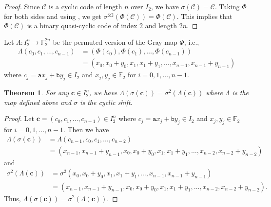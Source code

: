 \documentclass[12pt]{article}
\newtheorem{theorem}{Theorem}[section]
\theoremstyle{definition}
\theoremstyle{plain}
\newcommand{\Blue}[1]{{ \color{blue} #1}}
\begin{document}
\begin{proof}
Since $\mathcal{C}$ is a cyclic code of length $n$ over $I_2$, we have $\sigma (\mathcal{C}) = \mathcal{C}$. Taking $\Phi$ for both sides and using  , we get $\sigma^{\otimes 2} ( \Phi (\mathcal{C}) ) = \Phi (\mathcal{C})$. This implies that $\Phi (\mathcal{C})$ is a binary quasi-cyclic code of index $2$ and length $2n$.
\end{proof}



Let $\Lambda : I_2^n \to  \mathbb{F} _2^{2n}$ be the permuted version of the Gray map $\Phi$, i.e.,
\begin{align*}
\Lambda ( c_0 , c_1 , \dotsc , c_{n-1} ) &= ( \Phi (c_0) , \Phi (c_1 ) , \dotsc , \Phi (c_{n-1} )  )  \\
&= (  x_0 , x_0 + y_0 , x_1 , x_1 + y_1 , \dotsc ,  x_{n-1} ,  x_{n-1} + y_{n-1}   )
\end{align*}
where $c_j =  \mathtt{a}  x_j  +  \mathtt{b}  y_j \in I_2$ and $x_j, y_j \in   \mathbb{F} _2$ for $i = 0 , 1 , \dotsc , n-1$.


\begin{theorem}  \label{thm: Gray map variant and cyclic shift}
For any $ \mathbf{c}  \in  I_2^n$, we have $\Lambda ( \sigma ( \mathbf{c} ) ) = \sigma^2 ( \Lambda ( \mathbf{c} ) )$ where $\Lambda$ is the map defined above and $\sigma$ is the cyclic shift.
\end{theorem}


\begin{proof}
Let $ \mathbf{c} = (c_0 , c_1 , \dotsc , c_{n-1}) \in I_2^n$ where $c_j =  \mathtt{a}  x_j  +  \mathtt{b}  y_j \in I_2$ and $x_j, y_j \in   \mathbb{F} _2$ for $i = 0 , 1 , \dotsc , n-1$. Then we have
\begin{align*}
\Lambda ( \sigma ( \mathbf{c} )) &= \Lambda ( c_{n-1} , c_0 , c_1 , \dotsc , c_{n-2}  )  \\
&= ( x_{n-1} , x_{n-1} + y_{n-1} , x_0, x_0 + y_0,  x_1 , x_1 + y_1 , \dotsc , x_{n-2}  , x_{n-2} + y_{n-2}  )
\end{align*}
and
\begin{align*}
\sigma^2 (\Lambda ( \mathbf{c} )) &= \sigma^2 (  x_0 , x_0 + y_0 , x_1 , x_1 + y_1 , \dotsc ,  x_{n-1} ,  x_{n-1} + y_{n-1}   )  \\
&= ( x_{n-1} , x_{n-1} + y_{n-1} , x_0, x_0 + y_0,  x_1 , x_1 + y_1 , \dotsc , x_{n-2}  , x_{n-2} + y_{n-2}  ) .
\end{align*}
Thus, $\Lambda ( \sigma ( \mathbf{c} ) ) = \sigma^2 ( \Lambda ( \mathbf{c} ) )$.
\end{proof}
\end{document}
